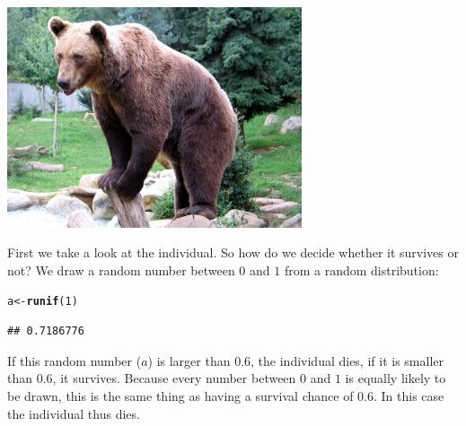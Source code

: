 \documentclass{article}\usepackage[]{graphicx}\usepackage[]{color}
\makeatletter
\newcommand{\hlnum}[1]{\textcolor[rgb]{0.686,0.059,0.569}{#1}}%
\newcommand{\hlstd}[1]{\textcolor[rgb]{0.345,0.345,0.345}{#1}}%
\newcommand{\hlkwb}[1]{\textcolor[rgb]{0.69,0.353,0.396}{#1}}%
\newcommand{\hlkwd}[1]{\textcolor[rgb]{0.737,0.353,0.396}{\textbf{#1}}}%
\newenvironment{kframe}{%
 \def\at@end@of@kframe{}%
 \ifinner\ifhmode%
  \def\at@end@of@kframe{\end{minipage}}%
  \begin{minipage}{\columnwidth}%
 \fi\fi%
 \def\FrameCommand##1{\hskip\@totalleftmargin \hskip-\fboxsep
 \colorbox{shadecolor}{##1}\hskip-\fboxsep
     \hskip-\linewidth \hskip-\@totalleftmargin \hskip\columnwidth}%
 \MakeFramed {\advance\hsize-\width
   \@totalleftmargin\z@ \linewidth\hsize
   \@setminipage}}%
 {\par\unskip\endMakeFramed%
 \at@end@of@kframe}
\newenvironment{knitrout}{}{} %
\makeatother
\begin{document}
\begin{center}
\includegraphics[width=0.65\textwidth]{Bear.jpg}
\end{center}
\vspace{1.5ex}

First we take a look at the individual. So how do we decide whether it survives or not? We draw a random number between $0$ and $1$ from a random distribution:
\begin{knitrout}
\color{fgcolor}\begin{kframe}
\begin{alltt}
\hlstd{a}\hlkwb{<-}\hlkwd{runif}\hlstd{(}\hlnum{1}\hlstd{)}
\end{alltt}
\begin{verbatim}
## 0.7186776
\end{verbatim}
\end{kframe}
\end{knitrout}
If this random number ($a$) is larger than $0.6$, the individual dies, if it is smaller than $0.6$, it survives. Because every number between $0$ and $1$ is equally likely to be drawn, this is the same thing as having a survival chance of $0.6$. In this case the individual thus dies.
\end{document}
